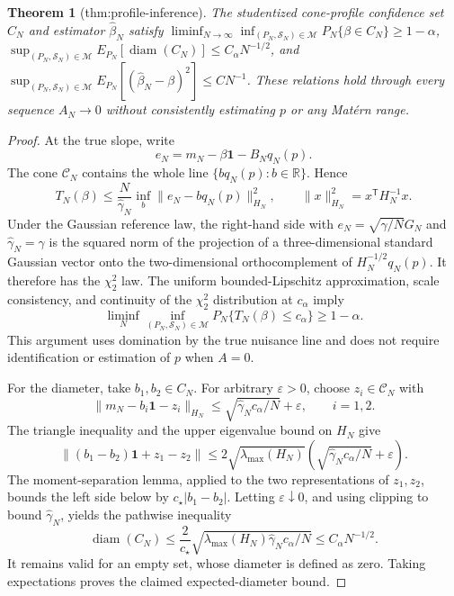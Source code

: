 \documentclass{article}
\newtheorem{theorem}{Theorem}
\begin{document}
\begin{theorem}[thm:profile-inference]\label{thm:profile-inference}
The studentized cone-profile confidence set \(C_N\) and estimator \(\widehat\beta_N\) satisfy \(\liminf_{N\to\infty}\inf_{(P_N,\mathcal S_N)\in\mathcal M}P_N\{\beta\in C_N\}\ge1-\alpha\), \(\sup_{(P_N,\mathcal S_N)\in\mathcal M}E_{P_N}[\operatorname{diam}(C_N)]\le C_{\alpha}N^{-1/2}\), and \(\sup_{(P_N,\mathcal S_N)\in\mathcal M}E_{P_N}[(\widehat\beta_N-\beta)^2]\le C N^{-1}\). These relations hold through every sequence \(A_N\to0\) without consistently estimating \(p\) or any Mat\'ern range.
\end{theorem}
\begin{proof}
At the true slope, write
\[
 e_N=m_N-\beta\mathbf1-B_Nq_N(p).
\]
The cone \(\mathcal C_N\) contains the whole line \(\{bq_N(p):b\in\mathbb R\}\).  Hence
\[
 T_N(\beta)
 \le \frac{N}{\widehat\gamma_N}
 \inf_b\|e_N-bq_N(p)\|_{H_N}^2,
 \qquad \|x\|_{H_N}^2=x^{\mathsf T}H_N^{-1}x.
\]
Under the Gaussian reference law, the right-hand side with \(e_N=\sqrt{\gamma/N}G_N\) and \(\widehat\gamma_N=\gamma\) is the squared norm of the projection of a three-dimensional standard Gaussian vector onto the two-dimensional orthocomplement of \(H_N^{-1/2}q_N(p)\).  It therefore has the \(\chi^2_2\) law.  The uniform bounded-Lipschitz approximation, scale consistency, and continuity of the \(\chi^2_2\) distribution at \(c_\alpha\) imply
\[
 \liminf_N\inf_{(P_N,\mathcal S_N)\in\mathcal M}
 P_N\{T_N(\beta)\le c_\alpha\}\ge1-\alpha.
\]
This argument uses domination by the true nuisance line and does not require identification or estimation of \(p\) when \(A=0\).

For the diameter, take \(b_1,b_2\in C_N\).  For arbitrary \(\varepsilon>0\), choose \(z_i\in\mathcal C_N\) with
\[
 \|m_N-b_i\mathbf1-z_i\|_{H_N}
 \le \sqrt{\widehat\gamma_Nc_\alpha/N}+\varepsilon,
 \qquad i=1,2.
\]
The triangle inequality and the upper eigenvalue bound on \(H_N\) give
\[
 \|(b_1-b_2)\mathbf1+z_1-z_2\|
 \le2\sqrt{\lambda_{\max}(H_N)}
 \left(\sqrt{\widehat\gamma_Nc_\alpha/N}+\varepsilon\right).
\]
The moment-separation lemma, applied to the two representations of \(z_1,z_2\), bounds the left side below by \(c_\star|b_1-b_2|\).  Letting \(\varepsilon\downarrow0\), and using clipping to bound \(\widehat\gamma_N\), yields the pathwise inequality
\[
 \operatorname{diam}(C_N)
 \le \frac{2}{c_\star}
 \sqrt{\lambda_{\max}(H_N)\widehat\gamma_Nc_\alpha/N}
 \le C_\alpha N^{-1/2}.
\]
It remains valid for an empty set, whose diameter is defined as zero.  Taking expectations proves the claimed expected-diameter bound.


\end{proof}
\end{document}
